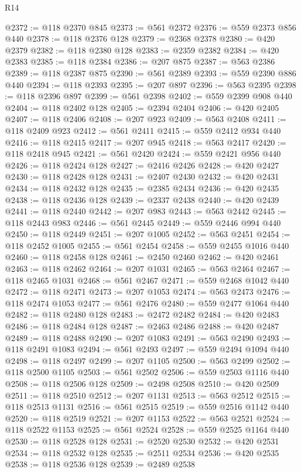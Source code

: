 \begin{lexlean}{R14}
\begin{coremodule}
@2372 := @118 @2370 @845
@2373 := @561 @2372
@2376 := @559 @2373 @856 @440
@2378 := @118 @2376 @128
@2379 := @2368 @2378
@2380 := @420 @2379
@2382 := @118 @2380 @128
@2383 := @2359 @2382
@2384 := @420 @2383
@2385 := @118 @2384
@2386 := @207 @875
@2387 := @563 @2386
@2389 := @118 @2387 @875
@2390 := @561 @2389
@2393 := @559 @2390 @886 @440
@2394 := @118 @2393
@2395 := @207 @897
@2396 := @563 @2395
@2398 := @118 @2396 @897
@2399 := @561 @2398
@2402 := @559 @2399 @908 @440
@2404 := @118 @2402 @128
@2405 := @2394 @2404
@2406 := @420 @2405
@2407 := @118 @2406
@2408 := @207 @923
@2409 := @563 @2408
@2411 := @118 @2409 @923
@2412 := @561 @2411
@2415 := @559 @2412 @934 @440
@2416 := @118 @2415
@2417 := @207 @945
@2418 := @563 @2417
@2420 := @118 @2418 @945
@2421 := @561 @2420
@2424 := @559 @2421 @956 @440
@2426 := @118 @2424 @128
@2427 := @2416 @2426
@2428 := @420 @2427
@2430 := @118 @2428 @128
@2431 := @2407 @2430
@2432 := @420 @2431
@2434 := @118 @2432 @128
@2435 := @2385 @2434
@2436 := @420 @2435
@2438 := @118 @2436 @128
@2439 := @2337 @2438
@2440 := @420 @2439
@2441 := @118 @2440
@2442 := @207 @983
@2443 := @563 @2442
@2445 := @118 @2443 @983
@2446 := @561 @2445
@2449 := @559 @2446 @994 @440
@2450 := @118 @2449
@2451 := @207 @1005
@2452 := @563 @2451
@2454 := @118 @2452 @1005
@2455 := @561 @2454
@2458 := @559 @2455 @1016 @440
@2460 := @118 @2458 @128
@2461 := @2450 @2460
@2462 := @420 @2461
@2463 := @118 @2462
@2464 := @207 @1031
@2465 := @563 @2464
@2467 := @118 @2465 @1031
@2468 := @561 @2467
@2471 := @559 @2468 @1042 @440
@2472 := @118 @2471
@2473 := @207 @1053
@2474 := @563 @2473
@2476 := @118 @2474 @1053
@2477 := @561 @2476
@2480 := @559 @2477 @1064 @440
@2482 := @118 @2480 @128
@2483 := @2472 @2482
@2484 := @420 @2483
@2486 := @118 @2484 @128
@2487 := @2463 @2486
@2488 := @420 @2487
@2489 := @118 @2488
@2490 := @207 @1083
@2491 := @563 @2490
@2493 := @118 @2491 @1083
@2494 := @561 @2493
@2497 := @559 @2494 @1094 @440
@2498 := @118 @2497
@2499 := @207 @1105
@2500 := @563 @2499
@2502 := @118 @2500 @1105
@2503 := @561 @2502
@2506 := @559 @2503 @1116 @440
@2508 := @118 @2506 @128
@2509 := @2498 @2508
@2510 := @420 @2509
@2511 := @118 @2510
@2512 := @207 @1131
@2513 := @563 @2512
@2515 := @118 @2513 @1131
@2516 := @561 @2515
@2519 := @559 @2516 @1142 @440
@2520 := @118 @2519
@2521 := @207 @1153
@2522 := @563 @2521
@2524 := @118 @2522 @1153
@2525 := @561 @2524
@2528 := @559 @2525 @1164 @440
@2530 := @118 @2528 @128
@2531 := @2520 @2530
@2532 := @420 @2531
@2534 := @118 @2532 @128
@2535 := @2511 @2534
@2536 := @420 @2535
@2538 := @118 @2536 @128
@2539 := @2489 @2538

\end{coremodule}
\end{lexlean}
